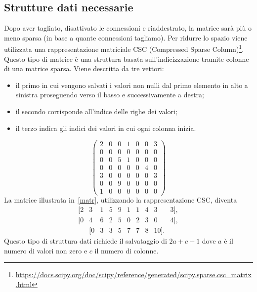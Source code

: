 \documentclass[11pt,a4paper,twoside,
openright]{book}
\begin{document}
\subsection{Strutture dati necessarie}
Dopo aver tagliato, disattivato le connessioni e riaddestrato, la matrice sarà più o meno sparsa (in base a quante connessioni tagliamo). Per ridurre lo spazio viene utilizzata una rappresentazione matriciale CSC (Compressed Sparse Column)\footnote{\url{https://docs.scipy.org/doc/scipy/reference/generated/scipy.sparse.csc_matrix.html}}.
Questo tipo di matrice è una struttura basata sull'indicizzazione tramite colonne di una matrice sparsa. Viene descritta da tre vettori:
\begin{itemize}
\item il primo in cui vengono salvati i valori non nulli dal primo elemento in alto a sinistra proseguendo verso il basso e successivamente a destra;
\item il secondo corrisponde all'indice delle righe dei valori;
\item il terzo indica gli indici dei valori in cui ogni colonna inizia.
\end{itemize}
\begin{equation}
\begin{pmatrix} 
   2 & 0 & 0 & 1 & 0 & 0 & 3 \\
   0 & 0 & 0 & 0 & 0 & 0 & 0 \\
   0 & 0 & 5 & 1 & 0 & 0 & 0 \\
   0 & 0 & 0 & 0 & 0 & 4 & 0 \\
   3 & 0 & 0 & 0 & 0 & 0 & 3 \\
   0 & 0 & 9 & 0 & 0 & 0 & 0 \\
   1 & 0 & 0 & 0 & 0 & 0 & 0 
\end{pmatrix}
\label{matr}
\end{equation}
La matrice illustrata in~\ref{matr}, utilizzando la rappresentazione CSC, diventa 
\begin{equation}
\begin{matrix} 
	[2 & 3 & 1 & 5 & 9 & 1 & 1 & 4 & 3 & 3], \\
	[0 & 4 & 6 & 2 & 5 & 0 & 2 & 3 & 0 & 4], \\
	   &[0 & 3 & 3 & 5 & 7 & 7 & 8 & 10].
\end{matrix}
\label{csc}
\end{equation}
Questo tipo di struttura dati richiede il salvataggio di $2a+c+1$ dove $a$ è il numero di valori non zero e $c$ il numero di colonne.
\end{document}
